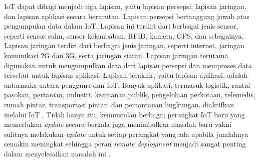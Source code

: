 IoT dapat dibagi menjadi tiga lapisan, yaitu lapisan persepsi, lapisan jaringan, dan lapisan aplikasi secara berurutan. Lapisan persepsi bertanggung jawab atas pengumpulan data dalam IoT. Lapisan ini terdiri dari berbagai jenis sensor, seperti sensor suhu, sensor kelembaban, RFID, kamera, GPS, dan sebagainya. Lapisan jaringan terdiri dari berbagai jenis jaringan, seperti internet, jaringan komunikasi 2G dan 3G, serta jaringan siaran. Lapisan jaringan terutama digunakan untuk mengumpulkan data dari lapisan persepsi dan memproses data tersebut untuk lapisan aplikasi. Lapisan terakhir, yaitu lapisan aplikasi, adalah antarmuka antara pengguna dan IoT. Banyak aplikasi, termasuk logistik, rantai pasokan, pertanian, industri, keamanan publik, pengelolaan perkotaan, telemedis, rumah pintar, transportasi pintar, dan pemantauan lingkungan, diaktifkan melalui IoT \parencite{SmartHomeSystemBasedOnIoTTechnologies}. Tidak hanya itu, kemunculan berbagai perangkat IoT baru yang memerlukan \textit{update} secara berkala juga menimbulkan masalah baru yakni sulitnya melakukan \textit{update} untuk setiap perangkat yang ada apabila jumlahnya semakin meningkat sehingga peran \textit{remote deployment} menjadi sangat penting dalam menyelesaikan masalah ini \parencite{RemoteDeployment}.